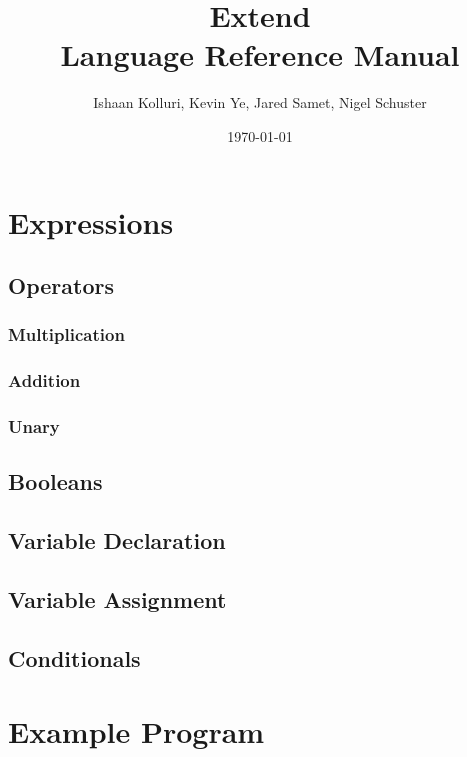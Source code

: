 \documentclass[titlepage]{article}
\title{Extend\\ Language Reference Manual}
\author{Ishaan Kolluri, Kevin Ye, Jared Samet, Nigel Schuster}
\date{\today}
\begin{document}
\maketitle
\tableofcontents

\section{Expressions}
\subsection{Operators}
\subsubsection{Multiplication}
\subsubsection{Addition}
\subsubsection{Unary}
\subsection{Booleans}
\subsection{Variable Declaration}
\subsection{Variable Assignment}
\subsection{Conditionals}


\section{Example Program}
\end{document}
